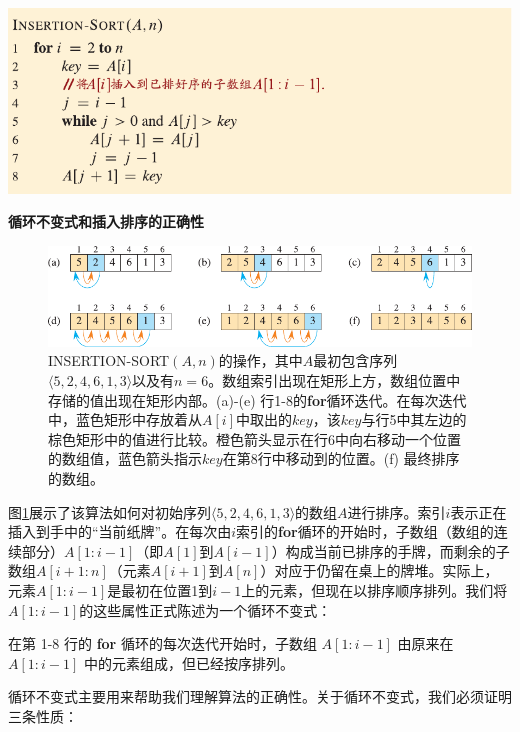 \documentclass[lang=cn,newtx,10pt,scheme=chinese]{elegantbook}
\begin{document}
\includegraphics{算法导论第四版插图/第二章/插入排序伪代码.pdf}

\textbf{循环不变式和插入排序的正确性}

\begin{figure}[htbp]
    \centering
    \includegraphics{算法导论第四版插图/第二章/插入排序过程示意图.pdf}
    \caption{INSERTION-SORT$(A,n)$的操作，其中$A$最初包含序列$\langle 5,2,4,6,1,3 \rangle$以及有$n=6$。数组索引出现在矩形上方，数组位置中存储的值出现在矩形内部。(a)-(e) 行1-8的\textbf{for}循环迭代。在每次迭代中，蓝色矩形中存放着从$A[i]$中取出的$key$，该$key$与行5中其左边的棕色矩形中的值进行比较。橙色箭头显示在行6中向右移动一个位置的数组值，蓝色箭头指示$key$在第8行中移动到的位置。(f) 最终排序的数组。}
    \label{fig:插入排序过程示意图}
\end{figure}

图\ref{fig:插入排序过程示意图}展示了该算法如何对初始序列$\langle 5,2,4,6,1,3\rangle$的数组$A$进行排序。索引$i$表示正在插入到手中的``当前纸牌''。在每次由$i$索引的\textbf{for}循环的开始时，子数组（数组的连续部分）$A[1:i-1]$（即$A[1]$到$A[i-1]$）构成当前已排序的手牌，而剩余的子数组$A[i+1:n]$（元素$A[i+1]$到$A[n]$）对应于仍留在桌上的牌堆。实际上，元素$A[1:i-1]$是最初在位置1到$i-1$上的元素，但现在以排序顺序排列。我们将$A[1:i-1]$的这些属性正式陈述为一个循环不变式：

\begin{tcolorbox}
在第 1-8 行的 \textbf{for} 循环的每次迭代开始时，子数组 $A[1:i-1]$ 由原来在 $A[1:i-1]$ 中的元素组成，但已经按序排列。
\end{tcolorbox}

循环不变式主要用来帮助我们理解算法的正确性。关于循环不变式，我们必须证明三条性质：
\end{document}

